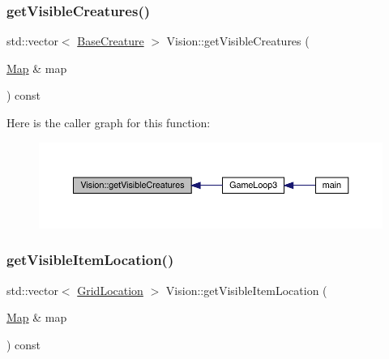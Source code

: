 \mbox{\label{class_vision_ad8806902c3144f15827fd93c1aabfa06}} 
\subsubsection{\texorpdfstring{get\+Visible\+Creatures()}{getVisibleCreatures()}}
{\footnotesize\ttfamily std\+::vector$<$ \mbox{\hyperlink{class_base_creature}{Base\+Creature}} $>$ Vision\+::get\+Visible\+Creatures (\begin{DoxyParamCaption}\item[{\mbox{\hyperlink{class_map}{Map}} \&}]{map }\end{DoxyParamCaption}) const}

Here is the caller graph for this function\+:
\nopagebreak
\begin{figure}[H]
\begin{center}
\leavevmode
\includegraphics[width=350pt]{da/d76/class_vision_ad8806902c3144f15827fd93c1aabfa06_icgraph}
\end{center}
\end{figure}
\mbox{\label{class_vision_aaada841a563a60650e2261796ff18713}} 
\subsubsection{\texorpdfstring{get\+Visible\+Item\+Location()}{getVisibleItemLocation()}}
{\footnotesize\ttfamily std\+::vector$<$ \mbox{\hyperlink{struct_grid_location}{Grid\+Location}} $>$ Vision\+::get\+Visible\+Item\+Location (\begin{DoxyParamCaption}\item[{\mbox{\hyperlink{class_map}{Map}} \&}]{map }\end{DoxyParamCaption}) const}

\mbox{\label{class_vision_a57e240a165d83bd1869e4053af0a4569}} 
